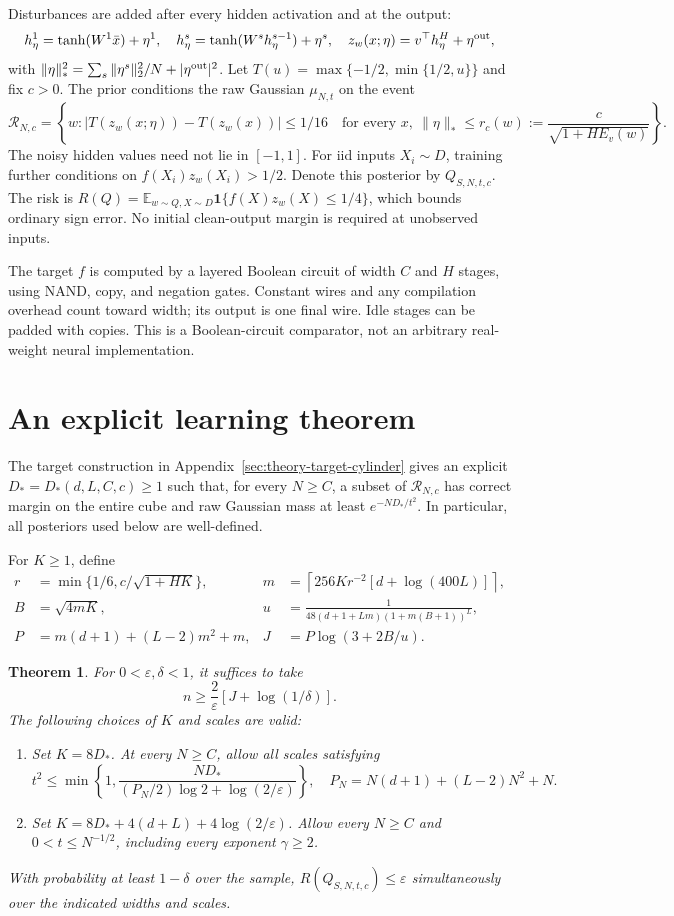 \documentclass[11pt]{article}
\newtheorem{theorem}{Theorem}[section]
\begin{document}
Disturbances are added after every hidden activation and at the output:
\[
 h^1_\eta=\tanh(W^1\bar x)+\eta^1,\quad
 h^s_\eta=\tanh(W^sh^{s-1}_\eta)+\eta^s,\quad
 z_w(x;\eta)=v^\top h^H_\eta+\eta^{\rm out},
\]
with $\|\eta\|_*^2=\sum_s\|\eta^s\|_2^2/N+|\eta^{\rm out}|^2$.
Let $T(u)=\max\{-1/2,\min\{1/2,u\}\}$ and fix $c>0$.
The prior conditions the raw Gaussian $\mu_{N,t}$ on the event
\[
 \mathcal R_{N,c}=\left\{w:
 |T(z_w(x;\eta))-T(z_w(x))|\le1/16\quad
 \text{for every }x,\ \|\eta\|_*\le
 r_c(w):=\frac{c}{\sqrt{1+HE_v(w)}}\right\}.
\]
The noisy hidden values need not lie in $[-1,1]$.
For iid inputs $X_i\sim D$, training further conditions on
$f(X_i)z_w(X_i)>1/2$. Denote this posterior by $Q_{S,N,t,c}$.
The risk is $R(Q)=\mathbb E_{w\sim Q,X\sim D}
\mathbf1\{f(X)z_w(X)\le1/4\}$, which bounds ordinary sign error.
No initial clean-output margin is required at unobserved inputs.

The target $f$ is computed by a layered Boolean circuit of width $C$ and
$H$ stages, using NAND, copy, and negation gates. Constant wires and any
compilation overhead count toward width; its output is one final wire.
Idle stages can be padded with copies. This is a Boolean-circuit comparator,
not an arbitrary real-weight neural implementation.

\section{An explicit learning theorem}
The target construction in Appendix~\ref{sec:theory-target-cylinder}
gives an explicit $D_*=D_*(d,L,C,c)\ge1$ such that, for every $N\ge C$,
a subset of $\mathcal R_{N,c}$ has correct margin on the entire cube and
raw Gaussian mass at least $e^{-ND_*/t^2}$. In particular, all posteriors
used below are well-defined.

For $K\ge1$, define
\begin{align*}
 r&=\min\{1/6,c/\sqrt{1+HK}\},&
 m&=\left\lceil256Kr^{-2}[d+\log(400L)]\right\rceil,\\
 B&=\sqrt{4mK},&
 u&=\frac1{48(d+1+Lm)(1+m(B+1))^L},\\
 P&=m(d+1)+(L-2)m^2+m,&
 J&=P\log(3+2B/u).
\end{align*}

\begin{theorem}\label{thm:main}
For $0<\varepsilon,\delta<1$, it suffices to take
\begin{equation}\label{eq:sample}
 n\ge\frac2\varepsilon[J+\log(1/\delta)].
\end{equation}
The following choices of $K$ and scales are valid:
\begin{enumerate}
\item Set $K=8D_*$. At every $N\ge C$, allow all scales satisfying
\[
 t^2\le\min\left\{1,
 \frac{ND_*}{(P_N/2)\log2+\log(2/\varepsilon)}\right\},
 \quad P_N=N(d+1)+(L-2)N^2+N.
\]
\item Set $K=8D_*+4(d+L)+4\log(2/\varepsilon)$. Allow every $N\ge C$
and $0<t\le N^{-1/2}$, including every exponent $\gamma\ge2$.
\end{enumerate}
With probability at least $1-\delta$ over the sample, $R(Q_{S,N,t,c})\le
\varepsilon$ simultaneously over the indicated widths and scales.
\end{theorem}
\end{document}

